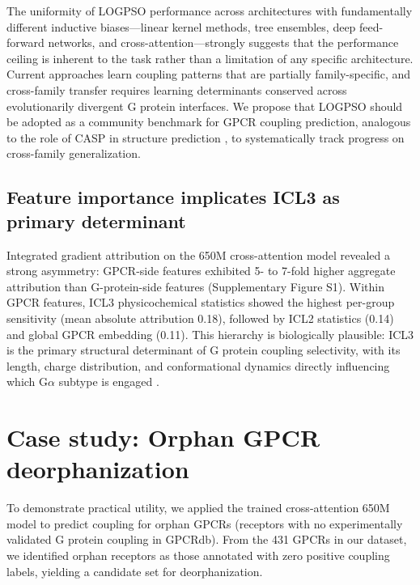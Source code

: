 \documentclass[11pt,a4paper]{article}
\begin{document}
The uniformity of LOGPSO performance across architectures with fundamentally different inductive biases---linear kernel methods, tree ensembles, deep feed-forward networks, and cross-attention---strongly suggests that the performance ceiling is inherent to the task rather than a limitation of any specific architecture. Current approaches learn coupling patterns that are partially family-specific, and cross-family transfer requires learning determinants conserved across evolutionarily divergent G protein interfaces. We propose that LOGPSO should be adopted as a community benchmark for GPCR coupling prediction, analogous to the role of CASP in structure prediction \cite{kryshtafovych2023casp15}, to systematically track progress on cross-family generalization.

\subsection{Feature importance implicates ICL3 as primary determinant}

Integrated gradient attribution on the 650M cross-attention model revealed a strong asymmetry: GPCR-side features exhibited 5- to 7-fold higher aggregate attribution than G-protein-side features (Supplementary Figure S1). Within GPCR features, ICL3 physicochemical statistics showed the highest per-group sensitivity (mean absolute attribution 0.18), followed by ICL2 statistics (0.14) and global GPCR embedding (0.11). This hierarchy is biologically plausible: ICL3 is the primary structural determinant of G protein coupling selectivity, with its length, charge distribution, and conformational dynamics directly influencing which G$\alpha$ subtype is engaged \cite{flock2023selectivity, rasmussen2011crystal}.

\section{Case study: Orphan GPCR deorphanization}

To demonstrate practical utility, we applied the trained cross-attention 650M model to predict coupling for orphan GPCRs (receptors with no experimentally validated G protein coupling in GPCRdb). From the 431 GPCRs in our dataset, we identified orphan receptors as those annotated with zero positive coupling labels, yielding a candidate set for deorphanization.
\end{document}
